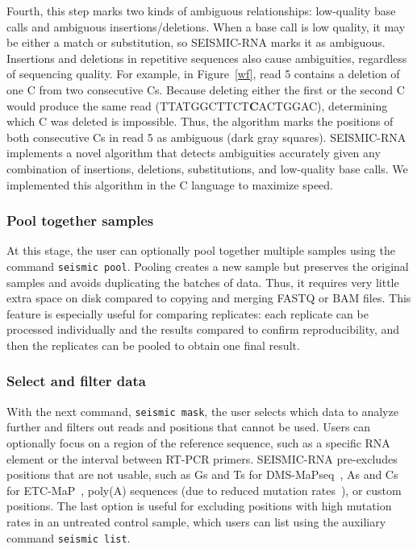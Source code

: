 \documentclass[11pt]{article}
\begin{document}
Fourth, this step marks two kinds of ambiguous relationships: low-quality base calls and ambiguous insertions/deletions.
When a base call is low quality, it may be either a match or substitution, so SEISMIC-RNA marks it as ambiguous.
Insertions and deletions in repetitive sequences also cause ambiguities, regardless of sequencing quality.
For example, in Figure~\ref{wf}, read 5 contains a deletion of one C from two consecutive Cs.
Because deleting either the first or the second C would produce the same read (TTATGGCTTCT\textbf{C}ACTGGAC), determining which C was deleted is impossible.
Thus, the algorithm marks the positions of both consecutive Cs in read 5 as ambiguous (dark gray squares).
SEISMIC-RNA implements a novel algorithm that detects ambiguities accurately given any combination of insertions, deletions, substitutions, and low-quality base calls.
We implemented this algorithm in the C language to maximize speed.

\subsubsection{Pool together samples}

At this stage, the user can optionally pool together multiple samples using the command \verb|seismic pool|.
Pooling creates a new sample but preserves the original samples and avoids duplicating the batches of data.
Thus, it requires very little extra space on disk compared to copying and merging FASTQ or BAM files.
This feature is especially useful for comparing replicates: each replicate can be processed individually and the results compared to confirm reproducibility, and then the replicates can be pooled to obtain one final result.

\subsubsection{Select and filter data}
\label{seismic-mask}

With the next command, \verb|seismic mask|, the user selects which data to analyze further and filters out reads and positions that cannot be used.
Users can optionally focus on a region of the reference sequence, such as a specific RNA element or the interval between RT-PCR primers.
SEISMIC-RNA pre-excludes positions that are not usable, such as Gs and Ts for DMS-MaPseq~\cite{Zubradt2016}, As and Cs for ETC-MaP~\cite{Douds2024}, poly(A) sequences (due to reduced mutation rates~\cite{Kladwang2020}), or custom positions.
The last option is useful for excluding positions with high mutation rates in an untreated control sample, which users can list using the auxiliary command \verb|seismic list|.
\end{document}
